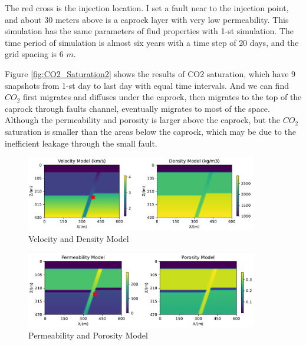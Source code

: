 The red cross is the injection location.
I set a fault near to the injection point, and about 30 meters above is a caprock layer with very low permeability.
This simulation has the same  parameters of flud properties with 1-st simulation.
The time period of simulation is almost six years with a time step of 20 days,
and the grid spacing is 6 $m$. 

Figure \ref{fig:CO2_Saturation2} shows the results of CO2 saturation, which have 9 snapshots from 1-st day to last day with equal time intervals.
And we can find 
$CO_2$ first migrates and diffuses under the caprock, then migrates to the top of the caprock through faults channel, 
eventually migrates to most of the space.
Although the permeability and porosity is larger above the caprock, 
but the $CO_2$ saturation is smaller than the areas below the caprock,
which may be  due to the inefficient leakage through the small fault.



\begin{figure}[H]
    \centering
    \includegraphics[width=0.9\textwidth]{figures/project/vel_density.pdf}
    \caption{Velocity and Density Model}
    \label{fig:vel_density}
\end{figure}



\begin{figure}[H]
    \centering
    \includegraphics[width=0.9\textwidth]{figures/project/pere_poro.pdf}
    \caption{Permeability and Porosity Model}
    \label{fig:pere_poro}
\end{figure}



